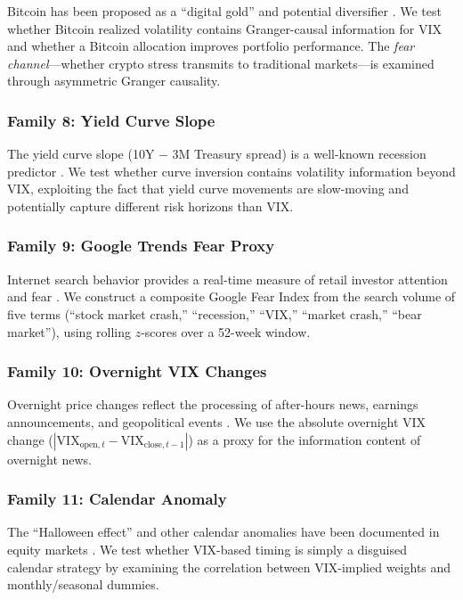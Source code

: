 \documentclass[12pt,a4paper]{article}
\begin{document}
Bitcoin has been proposed as a ``digital gold'' and potential diversifier \citep{bouri2017}. We test whether Bitcoin realized volatility contains Granger-causal information for VIX and whether a Bitcoin allocation improves portfolio performance. The \emph{fear channel}---whether crypto stress transmits to traditional markets---is examined through asymmetric Granger causality.

\subsubsection{Family 8: Yield Curve Slope}

The yield curve slope (10Y $-$ 3M Treasury spread) is a well-known recession predictor \citep{estrella1998}. We test whether curve inversion contains volatility information beyond VIX, exploiting the fact that yield curve movements are slow-moving and potentially capture different risk horizons than VIX.

\subsubsection{Family 9: Google Trends Fear Proxy}

Internet search behavior provides a real-time measure of retail investor attention and fear \citep{da2011, preis2013}. We construct a composite Google Fear Index from the search volume of five terms (``stock market crash,'' ``recession,'' ``VIX,'' ``market crash,'' ``bear market''), using rolling $z$-scores over a 52-week window.

\subsubsection{Family 10: Overnight VIX Changes}

Overnight price changes reflect the processing of after-hours news, earnings announcements, and geopolitical events \citep{lou2019}. We use the absolute overnight VIX change ($|\text{VIX}_{\text{open},t} - \text{VIX}_{\text{close},t-1}|$) as a proxy for the information content of overnight news.

\subsubsection{Family 11: Calendar Anomaly}

The ``Halloween effect'' and other calendar anomalies have been documented in equity markets \citep{bouman2002}. We test whether VIX-based timing is simply a disguised calendar strategy by examining the correlation between VIX-implied weights and monthly/seasonal dummies.
\end{document}
